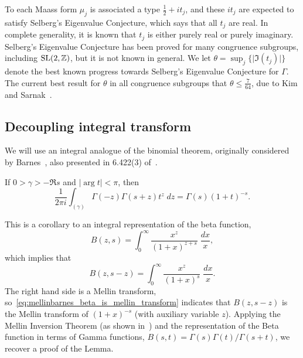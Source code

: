 To each Maass form $\mu_j$ is associated a type $\tfrac{1}{2} + it_j$, and these $it_j$
are expected to satisfy Selberg's Eigenvalue Conjecture, which says that all $t_j$ are
real.
In complete generality, it is known that $t_j$ is either purely real or purely imaginary.
Selberg's Eigenvalue Conjecture has been proved for many congruence subgroups, including
$\operatorname{SL}(2, \mathbb{Z})$, but it is not known in general.
We let $\theta = \sup_j \{ \lvert \Im(t_j) \rvert \}$ denote the best known progress
towards Selberg's Eigenvalue Conjecture for $\Gamma$.
The current best result for $\theta$ in all congruence subgroups that $\theta \leq
\tfrac{7}{64}$, due to Kim and Sarnak~\cite{KimSarnak03}.



\subsection{Decoupling integral transform}\label{ssec:mellinbarnes_decouple}


We will use an integral analogue of the binomial theorem, originally considered by
Barnes~\cite{Barnes}, also presented in 6.422(3) of~\cite{GradshteynRyzhik07}.
\begin{lemma}[Barnes, 1908]
  If $0 > \gamma > - \Re s$ and $\lvert \arg t \rvert < \pi$, then
  \begin{equation}\label{eq:mellinbarnes_base}
    \frac{1}{2\pi i} \int_{(\gamma)} \Gamma(-z) \Gamma(s + z) t^z \; dz = \Gamma(s) (1 +
    t)^{-s}.
  \end{equation}
\end{lemma}
This is a corollary to an integral representation of the beta function,
\begin{equation}
  B(z, s) = \int_0^\infty \frac{x^z}{(1 + x)^{z + s}} \; \frac{dx}{x},
\end{equation}
which implies that
\begin{equation}\label{eq:mellinbarnes_beta_is_mellin_transform}
  B(z, s-z) = \int_0^\infty \frac{x^z}{(1+x)^{s}} \; \frac{dx}{x}.
\end{equation}
The right hand side is a Mellin transform,
so~\eqref{eq:mellinbarnes_beta_is_mellin_transform} indicates that $B(z, s-z)$ is the
Mellin transform of $(1+x)^{-s}$ (with auxiliary variable $z$).
Applying the Mellin Inversion Theorem (as shown in~\cite{titchmarshfourier}) and the
representation of the Beta function in terms of Gamma functions, $B(s,t) =
\Gamma(s)\Gamma(t) / \Gamma(s+t)$, we recover a proof of the Lemma.


